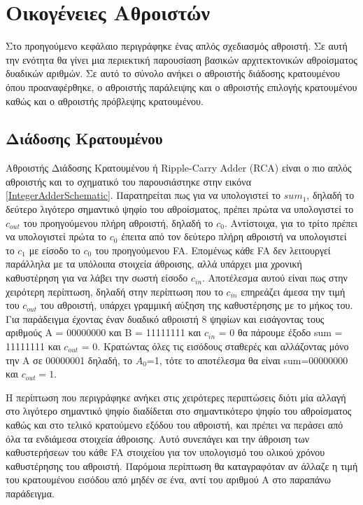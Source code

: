 \section{Οικογένειες Αθροιστών}
Στο προηγούμενο κεφάλαιο περιγράφηκε ένας απλός σχεδιασμός αθροιστή. Σε αυτή την ενότητα θα γίνει μια περιεκτική παρουσίαση βασικών αρχιτεκτονικών αθροίσματος δυαδικών αριθμών. Σε αυτό το σύνολο ανήκει ο αθροιστής διάδοσης κρατουμένου όπου προαναφέρθηκε, ο αθροιστής παράλειψης και ο αθροιστής επιλογής κρατουμένου καθώς και ο αθροιστής πρόβλεψης κρατουμένου.



\subsection{Διάδοσης Κρατουμένου}
Αθροιστής Διάδοσης Κρατουμένου ή Ripple-Carry Adder (RCA) είναι ο πιο απλός αθροιστής και το σχηματικό του παρουσιάστηκε στην εικόνα \ref{IntegerAdderSchematic}. Παρατηρείται πως για να υπολογιστεί το $sum_1$, δηλαδή το δεύτερο λιγότερο σημαντικό ψηφίο του αθροίσματος, πρέπει πρώτα να υπολογιστεί το $c_{out}$ του προηγούμενου πλήρη αθροιστή, δηλαδή το $c_0$. Αντίστοιχα, για το τρίτο πρέπει να υπολογιστεί πρώτα το $c_0$ έπειτα από τον δεύτερο πλήρη αθροιστή να υπολογιστεί το $c_1$ με είσοδο το $c_0$ του προηγούμενου FA. Επομένως κάθε FA δεν λειτουργεί παράλληλα με τα υπόλοιπα στοιχεία άθροισης, αλλά υπάρχει μια χρονική καθυστέρηση για να λάβει την σωστή είσοδο $c_{in}$. Αποτέλεσμα αυτού είναι πως στην χειρότερη περίπτωση, δηλαδή στην περίπτωση που το $c_{in}$ επηρεάζει άμεσα την τιμή του $c_{out}$ του αθροιστή, υπάρχει γραμμική αύξηση της καθυστέρησης με το μήκος του.
Για παράδειγμα έχοντας έναν δυαδικό αθροιστή 8 ψηφίων και εισάγοντας τους αριθμούς Α = 00000000 και Β = 11111111 και $c_{in}$ = 0 θα πάρουμε έξοδο sum = 11111111 και $c_{out}$ = 0. Κρατώντας όλες τις εισόδους σταθερές και αλλάζοντας μόνο την Α σε 00000001 δηλαδή, το $A_0$=1, τότε το αποτέλεσμα θα είναι sum=00000000 και $c_{out}=1$. 

Η περίπτωση που περιγράφηκε ανήκει στις χειρότερες περιπτώσεις διότι μία αλλαγή στο λιγότερο σημαντικό ψηφίο διαδίδεται στο σημαντικότερο ψηφίο του αθροίσματος καθώς και στο τελικό κρατούμενο εξόδου του αθροιστή, και πρέπει να περάσει από όλα τα ενδιάμεσα στοιχεία άθροισης. Αυτό συνεπάγει και την άθροιση των καθυστερήσεων του κάθε FA στοιχείου για τον υπολογισμό του ολικού χρόνου καθυστέρησης του αθροιστή. Παρόμοια περίπτωση θα καταγραφόταν αν άλλαζε η τιμή του κρατουμένου εισόδου από μηδέν σε ένα, αντί του αριθμού A στο παραπάνω παράδειγμα.

